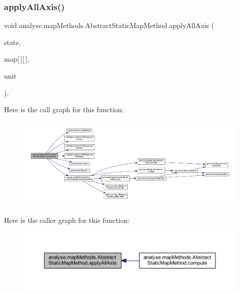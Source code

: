 \subsubsection{\texorpdfstring{apply\+All\+Axis()}{applyAllAxis()}}
{\footnotesize\ttfamily void analyse.\+map\+Methods.\+Abstract\+Static\+Map\+Method.\+apply\+All\+Axis (\begin{DoxyParamCaption}\item[{\mbox{\hyperlink{classgame_1_1game_state_1_1_game_state}{Game\+State}}}]{state,  }\item[{double}]{map\mbox{[}$\,$\mbox{]}\mbox{[}$\,$\mbox{]},  }\item[{\mbox{\hyperlink{classgame_1_1board_1_1_unit}{Unit}}}]{unit }\end{DoxyParamCaption})\hspace{0.3cm}{\ttfamily [inline]}, {\ttfamily [private]}}

Here is the call graph for this function\+:
\nopagebreak
\begin{figure}[H]
\begin{center}
\leavevmode
\includegraphics[width=350pt]{classanalyse_1_1map_methods_1_1_abstract_static_map_method_a99af8635f28b5755001b9dfbbeee6b30_cgraph}
\end{center}
\end{figure}
Here is the caller graph for this function\+:
\nopagebreak
\begin{figure}[H]
\begin{center}
\leavevmode
\includegraphics[width=350pt]{classanalyse_1_1map_methods_1_1_abstract_static_map_method_a99af8635f28b5755001b9dfbbeee6b30_icgraph}
\end{center}
\end{figure}
\mbox{\label{classanalyse_1_1map_methods_1_1_abstract_static_map_method_af36453d4f13bf86967d153d5e5575ad5}} 
